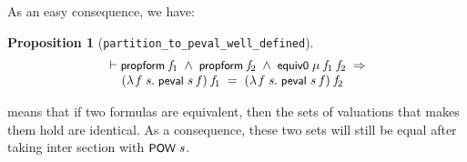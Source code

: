 \documentclass[letterpaper]{article}
\newtheorem{prop}{Proposition}
\renewcommand{\HOLConst}[1]{{\textsf{\upshape\small #1}}}
\renewcommand{\HOLinline}[1]{\ensuremath{#1}}
\newenvironment{holmath}{\begin{displaymath}\begin{array}{l}}{\end{array}\end{displaymath}\ignorespacesafterend}
\begin{document}

As an easy consequence, we have:
\begin{prop}[\texttt{partition_to_peval_well_defined}]
\begin{holmath}
  \ensuremath{\HOLTokenTurnstile}\HOLConst{propform}\;\HOLFreeVar{f\sb{\mathrm{1}}}\;\HOLSymConst{\HOLTokenConj{}}\;\HOLConst{propform}\;\HOLFreeVar{f\sb{\mathrm{2}}}\;\HOLSymConst{\HOLTokenConj{}}\;\HOLConst{equiv0}\;\HOLFreeVar{\ensuremath{\mu}}\;\HOLFreeVar{f\sb{\mathrm{1}}}\;\HOLFreeVar{f\sb{\mathrm{2}}}\;\HOLSymConst{\HOLTokenImp{}}\\
\;\;\;\;\;(\HOLTokenLambda{}\HOLBoundVar{f}\;\HOLBoundVar{s}.\;\HOLConst{peval}\;\HOLBoundVar{s}\;\HOLBoundVar{f})\;\HOLFreeVar{f\sb{\mathrm{1}}}\;\HOLSymConst{=}\;(\HOLTokenLambda{}\HOLBoundVar{f}\;\HOLBoundVar{s}.\;\HOLConst{peval}\;\HOLBoundVar{s}\;\HOLBoundVar{f})\;\HOLFreeVar{f\sb{\mathrm{2}}}
\end{holmath}
\end{prop}

means that if two formulas are equivalent, then the sets of valuations that makes them hold are identical. As a consequence, these two sets will still be equal after taking inter section with \HOLinline{\HOLConst{POW}\;\HOLFreeVar{s}}.
\end{document}
